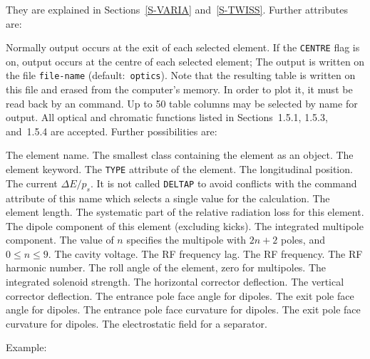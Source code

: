 They are explained in Sections~\ref{S-VARIA} and~\ref{S-TWISS}.
Further attributes are:
\begin{mylist}
Normally output occurs at the exit of each selected element.
If the {\tt CENTRE} flag is on,
output occurs at the centre of each selected element;
The output is written on the file {\tt file-name}
(default:~{\tt optics}).
Note that the resulting table is written on this file and erased from
the computer's memory.
In order to plot it, it must be read back by an 
command.
Up to 50 table columns may be selected by name for output.
All optical and chromatic functions listed
in Sections~1.5.1, 1.5.3, and~1.5.4 are accepted.
Further possibilities are:
\begin{mylist}
The element name.
The smallest class containing the element as an object.
The element keyword.
The {\tt TYPE} attribute of the element.
The longitudinal position.
The current \(\Delta E / p_s\).
It is not called {\tt DELTAP} to avoid conflicts with the command
attribute of this name which selects a single value for the calculation.
The element length.
The systematic part of the relative radiation loss for this element.
The dipole component of this element (excluding kicks).
The integrated multipole component. The value of \(n\) specifies the
multipole with \(2n+2\) poles, and \(0 \le n \le 9\).
The cavity voltage.
The RF frequency lag.
The RF frequency.
The RF harmonic number.
The roll angle of the element, zero for multipoles.
The integrated solenoid strength.
The horizontal corrector deflection.
The vertical corrector deflection.
The entrance pole face angle for dipoles.
The exit pole face angle for dipoles.
The entrance pole face curvature for dipoles.
The exit pole face curvature for dipoles.
The electrostatic field for a separator.
\end{mylist}
\end{mylist}
Example:

